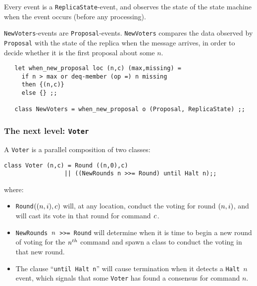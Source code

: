 \documentclass[final]{article}
\begin{document}
Every event is a \lstinline{ReplicaState}-event, and observes the
state of the state machine when the event occurs (before any processing).

\lstinline{NewVoters}-events are \lstinline{Proposal}-events.
\lstinline{NewVoters} compares the data observed by
\lstinline{Proposal} with the state of the replica when the message
arrives, in order to decide whether it is the first proposal about some
$n$.
\begin{emlcode}
\begin{lstlisting}
   let when_new_proposal loc (n,c) (max,missing) =
     if n > max or deq-member (op =) n missing
     then {(n,c)}
     else {} ;;

   class NewVoters = when_new_proposal o (Proposal, ReplicaState) ;;
\end{lstlisting}
\end{emlcode}

\subsubsection{The next level:
  \lstinline{Voter}}\label{sec:simple-next-level}

A \lstinline{Voter} is a parallel composition of two classes:
\begin{emlcode}
\begin{lstlisting}
class Voter (n,c) = Round ((n,0),c)
                 || ((NewRounds n >>= Round) until Halt n);;
\end{lstlisting}
\end{emlcode}
where:
\begin{itemize}
\item \lstinline{Round}$\mathit{(}(n,i),c)$ will, at any location, conduct the
  voting for round $\mathit{(}n,i)$, and will
  cast its vote in that round for command $\mathit{c}$.

\item \lstinline{NewRounds}~$\mathit{n}$~\lstinline{>>= Round} will
  determine when it is time to begin a new round of voting for the
  $\mathit{n}^{th}$ command and spawn a class to conduct the voting in
  that new round.

\item
  The clause ``\lstinline{until Halt n}''%
  will cause termination when it detects a \lstinline{Halt}~$n$ event,
  which signals that some \lstinline{Voter} has found a consensus for
  command $n$.
\end{itemize}
\end{document}
